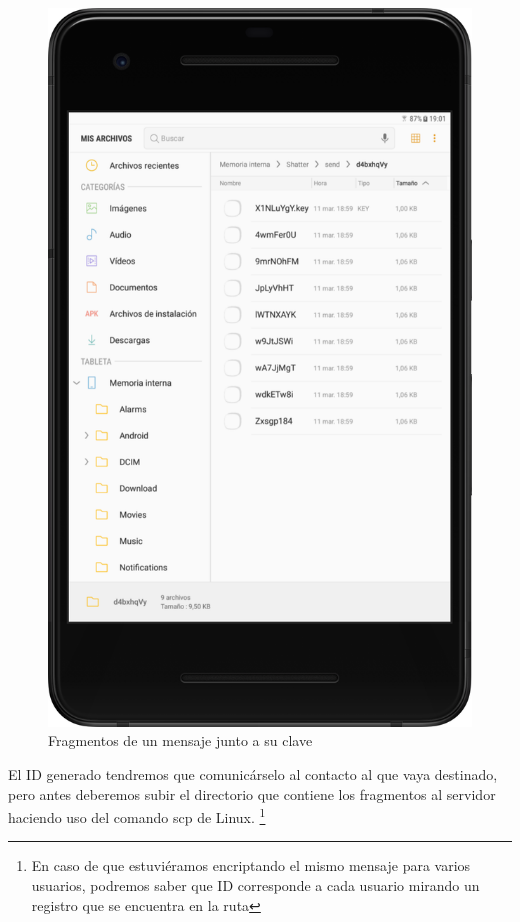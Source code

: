 \begin{figure}[ht]
  \centering
  \includegraphics[scale=0.4]{Figures/encfiles}
  \decoRule
  \caption[Shatter (Mensaje fragmentado)]{Fragmentos de un mensaje junto a su
  clave}
  \label{fig:encfiles}
\end{figure}

El ID generado tendremos que comunicárselo al contacto al que vaya destinado,
pero antes deberemos subir el directorio que contiene los fragmentos al servidor
haciendo uso del comando scp de Linux. \footnote{En caso de que estuviéramos
encriptando el mismo mensaje para varios usuarios, podremos saber que ID
corresponde a cada usuario mirando un registro que se encuentra en la ruta
}

